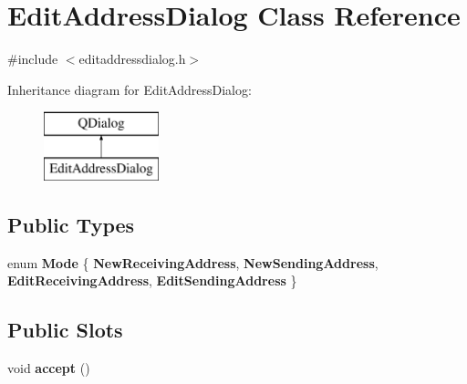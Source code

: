 \hypertarget{class_edit_address_dialog}{}\section{Edit\+Address\+Dialog Class Reference}
\label{class_edit_address_dialog}


{\ttfamily \#include $<$editaddressdialog.\+h$>$}

Inheritance diagram for Edit\+Address\+Dialog\+:\begin{figure}[H]
\begin{center}
\leavevmode
\includegraphics[height=2.000000cm]{class_edit_address_dialog}
\end{center}
\end{figure}
\subsection*{Public Types}
\begin{DoxyCompactItemize}
\item 
\mbox{\label{class_edit_address_dialog_a456fdd27ee1c150824241ded7bb4de3a}} 
enum {\bfseries Mode} \{ {\bfseries New\+Receiving\+Address}, 
{\bfseries New\+Sending\+Address}, 
{\bfseries Edit\+Receiving\+Address}, 
{\bfseries Edit\+Sending\+Address}
 \}
\end{DoxyCompactItemize}
\subsection*{Public Slots}
\begin{DoxyCompactItemize}
\item 
\mbox{\label{class_edit_address_dialog_ac52b71129806bccf6533d0e9441393b6}} 
void {\bfseries accept} ()
\end{DoxyCompactItemize}
